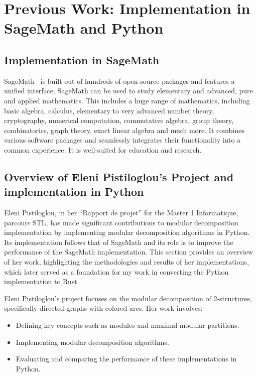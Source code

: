 
\chapter{Previous Work: Implementation in SageMath and Python}\label{ch:previous-work-implementation-in-sagemath-and-python}

\section{Implementation in SageMath}\label{sec:implementation-in-sagemath}

SageMath~\cite{sagemathtour} is built out of hundreds of open-source packages and features a unified interface.
SageMath can be used to study elementary and advanced, pure and applied mathematics.
This includes a huge range of mathematics, including basic algebra, calculus, elementary to very advanced number theory, cryptography, numerical computation, commutative algebra, group theory, combinatorics, graph theory, exact linear algebra and much more.
It combines various software packages and seamlessly integrates their functionality into a common experience.
It is well-suited for education and research.


\section{Overview of Eleni Pistiloglou's Project and implementation in Python}\label{sec:overview-of-eleni-pistiloglou's-project-and-implementation-in-python}

Eleni Pistiloglou, in her ``Rapport de projet''\cite{DM2S} for the Master 1 Informatique, parcours STL, has made significant contributions to modular decomposition implementation by implementing modular decomposition algorithms in Python.
Its implementation follows that of SageMath and its role is to improve the performance of the SageMath implementation.
This section provides an overview of her work, highlighting the methodologies and results of her implementations, which later served as a foundation for my work in converting the Python implementation to Rust.

Eleni Pistiloglou's project focuses on the modular decomposition of 2-structures, specifically directed graphs with colored arcs.
Her work involves:
\begin{itemize}
    \item Defining key concepts such as modules and maximal modular partitions.
    \item Implementing modular decomposition algorithms.
    \item Evaluating and comparing the performance of these implementations in Python.
\end{itemize}

